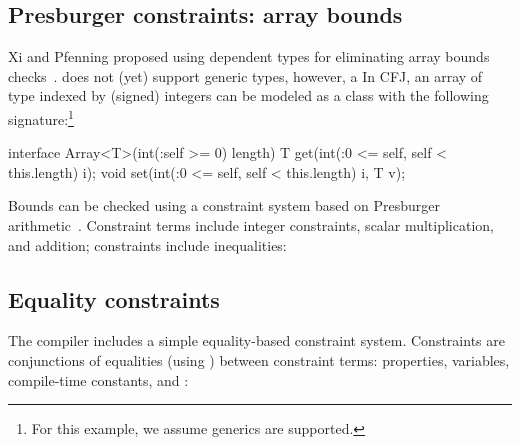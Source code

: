 \subsection{Presburger constraints: array bounds}

Xi and Pfenning proposed using dependent types for eliminating
array bounds checks~\cite{xi98array}.
\Xten{} does not (yet) support generic types, however, a 
In CFJ, an array of type  indexed by (signed) integers
can be modeled as a class with the following
signature:\footnote{For this example, we assume generics
are supported.}
\begin{displayxten}
interface Array<T>(int(:self >= 0) length) {
  T get(int(:0 <= self, self < this.length) i);
  void set(int(:0 <= self, self < this.length) i, T v);
}
\end{displayxten}

Bounds can be checked using a constraint system based on
Presburger arithmetic~\cite{omega}.  Constraint terms include
integer constraints, scalar multiplication, and addition;
constraints include inequalities:
\fi





\subsection{Equality constraints}

The \Xten{} compiler includes a simple equality-based constraint
system.  Constraints are conjunctions of equalities (using \xcd{==}) between
constraint terms: properties,  variables, 
compile-time constants, and :

